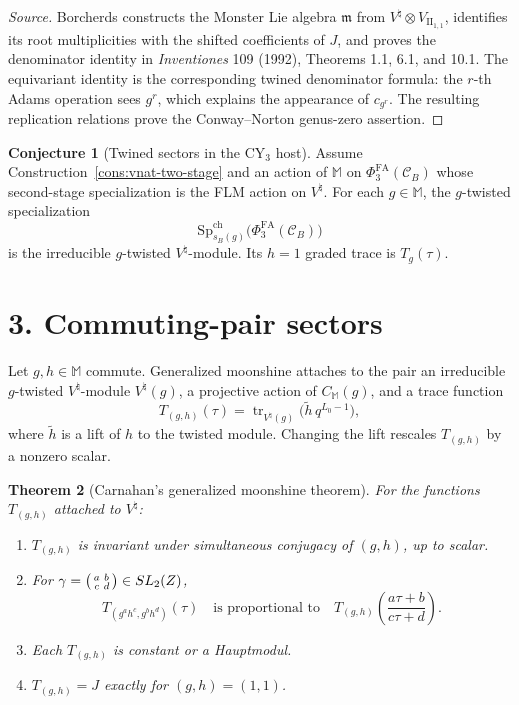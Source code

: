 \documentclass[11pt]{article}
\providecommand{\Z}{\mathbb{Z}}
\providecommand{\Vnat}{V^{\natural}}
\providecommand{\Mon}{\mathbb{M}}
\providecommand{\mMon}{\mathfrak{m}}
\providecommand{\SpCh}{\mathrm{Sp}^{\mathrm{ch}}}
\providecommand{\PhiFA}{\Phi^{\mathrm{FA}}}
\providecommand{\Tg}{T_g}
\providecommand{\Tgh}{T_{(g,h)}}
\providecommand{\Tr}{\operatorname{tr}}
\theoremstyle{plain}
\newtheorem{theorem}{Theorem}
\theoremstyle{definition}
\newtheorem{conjecture}[theorem]{Conjecture}
\begin{document}
\begin{proof}[Source]
Borcherds constructs the Monster Lie algebra \(\mMon\) from
\(\Vnat\otimes V_{\mathrm{II}_{1,1}}\), identifies its root
multiplicities with the shifted coefficients of \(J\), and proves the
denominator identity in \emph{Inventiones} 109 (1992), Theorems 1.1,
6.1, and 10.1. The equivariant identity is the corresponding twined
denominator formula: the \(r\)-th Adams operation sees \(g^r\), which
explains the appearance of \(c_{g^r}\). The resulting replication
relations prove the Conway--Norton genus-zero assertion.
\end{proof}

\begin{conjecture}[Twined sectors in the CY\(_3\) host]
\label{conj:g-twisted-spec}
Assume Construction~\ref{cons:vnat-two-stage} and an action of
\(\Mon\) on \(\PhiFA_3(\mathcal C_B)\) whose second-stage specialization
is the FLM action on \(\Vnat\). For each \(g\in\Mon\), the
\(g\)-twisted specialization
\[
  \SpCh_{s_B(g)}\bigl(\PhiFA_3(\mathcal C_B)\bigr)
\]
is the irreducible \(g\)-twisted \(\Vnat\)-module. Its \(h=1\) graded
trace is \(\Tg(\tau)\).
\end{conjecture}

\section*{3. Commuting-pair sectors}

Let \(g,h\in\Mon\) commute. Generalized moonshine attaches to the pair
an irreducible \(g\)-twisted \(\Vnat\)-module \(V^\natural(g)\), a
projective action of \(C_{\Mon}(g)\), and a trace function
\[
  \Tgh(\tau)
  =
  \Tr_{V^\natural(g)}
  \bigl(\widetilde h\,q^{L_0-1}\bigr),
\]
where \(\widetilde h\) is a lift of \(h\) to the twisted module. Changing
the lift rescales \(\Tgh\) by a nonzero scalar.

\begin{theorem}[Carnahan's generalized moonshine theorem]
\label{thm:carnahan-generalized-moonshine}
For the functions \(\Tgh\) attached to \(V^\natural\):
\begin{enumerate}
\item \(\Tgh\) is invariant under simultaneous conjugacy of
\((g,h)\), up to scalar.
\item For
\(\gamma=\begin{psmallmatrix}a&b\\ c&d\end{psmallmatrix}\in
\mathrm{SL}_2(\Z)\),
\[
  T_{(g^a h^c,g^b h^d)}(\tau)
  \quad\text{is proportional to}\quad
  \Tgh\!\left(\frac{a\tau+b}{c\tau+d}\right).
\]
\item Each \(\Tgh\) is constant or a Hauptmodul.
\item \(\Tgh=J\) exactly for \((g,h)=(1,1)\).
\end{enumerate}
\end{theorem}
\end{document}

